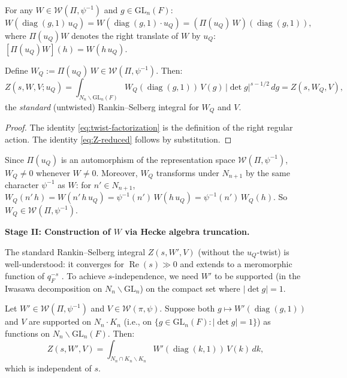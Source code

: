 \begin{proposition}\label{prop:twist-reduction}
For any $W \in \mathcal{W}(\Pi, \psi^{-1})$ and $g \in \mathrm{GL}_n(F)$:
\begin{equation}\label{eq:twist-factorization}
  W(\operatorname{diag}(g,1)\,u_Q)
  = W\!\left(\operatorname{diag}(g,1) \cdot u_Q\right)
  = (\Pi(u_Q)\,W)\!\left(\operatorname{diag}(g,1)\right),
\end{equation}
where $\Pi(u_Q)W$ denotes the right translate of $W$ by $u_Q$:
$[\Pi(u_Q)W](h) = W(h\,u_Q)$.

Define $W_Q := \Pi(u_Q)\,W \in \mathcal{W}(\Pi, \psi^{-1})$. Then:
\begin{equation}\label{eq:Z-reduced}
  Z(s, W, V; u_Q)
  = \int_{N_n \backslash \mathrm{GL}_n(F)}
  W_Q(\operatorname{diag}(g,1))\,V(g)\,|\!\det g|^{s-1/2}\,dg
  = Z(s, W_Q, V),
\end{equation}
the \emph{standard} (untwisted) Rankin--Selberg integral for $W_Q$ and $V$.
\end{proposition}

\begin{proof}
The identity \eqref{eq:twist-factorization} is the definition of the right
regular action. The identity \eqref{eq:Z-reduced} follows by substitution.
\end{proof}

\begin{remark}\label{rem:WQ-nonzero}
Since $\Pi(u_Q)$ is an automorphism of the representation space
$\mathcal{W}(\Pi, \psi^{-1})$, $W_Q \neq 0$ whenever $W \neq 0$. Moreover,
$W_Q$ transforms under $N_{n+1}$ by the same character $\psi^{-1}$ as $W$:
for $n' \in N_{n+1}$, $W_Q(n'\,h) = W(n'\,h\,u_Q) = \psi^{-1}(n')\,W(h\,u_Q)
= \psi^{-1}(n')\,W_Q(h)$. So $W_Q \in \mathcal{W}(\Pi, \psi^{-1})$.
\end{remark}

\bigskip
\noindent\textbf{Stage II: Construction of $W$ via Hecke algebra truncation.}

The standard Rankin--Selberg integral $Z(s, W', V)$ (without the $u_Q$-twist)
is well-understood: it converges for $\operatorname{Re}(s) \gg 0$ and extends
to a meromorphic function of $q_F^{-s}$ \cite{JPSS83}. To achieve
$s$-independence, we need $W'$ to be supported (in the Iwasawa decomposition
on $N_n \backslash \mathrm{GL}_n$) on the compact set where $|\!\det g| = 1$.

\begin{lemma}\label{lem:s-independence}
Let $W' \in \mathcal{W}(\Pi, \psi^{-1})$ and $V \in \mathcal{W}(\pi, \psi)$.
Suppose both $g \mapsto W'(\operatorname{diag}(g,1))$ and $V$ are supported
on $N_n \cdot K_n$ (i.e., on $\{g \in \mathrm{GL}_n(F) : |\!\det g| = 1\}$)
as functions on $N_n \backslash \mathrm{GL}_n(F)$. Then:
\begin{equation}\label{eq:s-independence}
  Z(s, W', V) = \int_{N_n \cap K_n \backslash K_n}
  W'(\operatorname{diag}(k,1))\,V(k)\,dk,
\end{equation}
which is independent of $s$.
\end{lemma}

